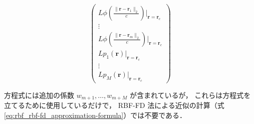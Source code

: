 \begin{equation}
\begin{pmatrix}
        L \phi\left(\frac{\|\bm{r} - \bm{r}_1\|_2}{c}\right) |_{\bm{r} = \bm{r}_c} \\
        \vdots                                                                     \\
        L \phi\left(\frac{\|\bm{r} - \bm{r}_m\|_2}{c}\right) |_{\bm{r} = \bm{r}_c} \\
        L p_1(\bm{r}) |_{\bm{r} = \bm{r}_c}                                        \\
        \vdots                                                                     \\
        L p_M(\bm{r}) |_{\bm{r} = \bm{r}_c}
    \end{pmatrix}
\end{equation}

方程式には追加の係数 $w_{m+1}, \ldots, w_{m+M}$ が含まれているが，
これらは方程式を立てるために使用しているだけで，
RBF-FD 法による近似の計算（式 \eqref{eq:rbf_rbf-fd_approximation-formula}）では不要である．
